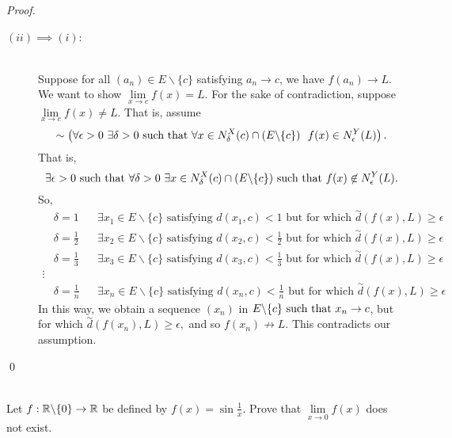 \begin{proof}
\begin{description}
        \item[$(ii) \implies (i)$:] \leavevmode \\
        Suppose for all $(a_n) \in E \backslash \{c\}$ satisfying $a_n \to c$, we have $f(a_n) \to L.$ We want to show $\lim \limits_{x \to c} f(x) = L.$ For the sake of contradiction, suppose $\lim \limits_{x \to c} f(x) \not = L$. That is, assume
        $$\sim \left(\forall \epsilon > 0 ~\exists \delta > 0 \text{ such that } \forall x \in N_{\delta}^{X}(c)\cap (E \backslash \{c\}) ~~f(x) \in N_{\epsilon}^{Y}(L)\right).$$
        That is,
        $$\exists \epsilon > 0 \text{ such that } \forall \delta > 0 ~\exists x \in N_{\delta}^{X}(c) \cap (E \backslash \{c\}) \text{ such that } f(x) \not \in N_{\epsilon}^{Y}(L).$$
        So,
        \begin{align*}
            &\delta = 1 &&\exists x_1 \in E\backslash\{c\} \text{ satisfying $d(x_1, c) < 1$ but for which $\overset{\sim}{d}(f(x), L) \geq \epsilon$} \\
            &\delta = \frac{1}{2} &&\exists x_2 \in E\backslash\{c\} \text{ satisfying $d(x_2, c) < \frac{1}{2}$ but for which $\overset{\sim}{d}(f(x), L) \geq \epsilon$} \\
            &\delta = \frac{1}{3} &&\exists x_3 \in E\backslash\{c\} \text{ satisfying $d(x_3, c) < \frac{1}{3}$ but for which $\overset{\sim}{d}(f(x), L) \geq \epsilon$} \\
            \vdots \\
            &\delta = \frac{1}{n} &&\exists x_n \in E\backslash\{c\} \text{ satisfying $d(x_n, c) < \frac{1}{n}$ but for which $\overset{\sim}{d}(f(x), L) \geq \epsilon$}
        \end{align*}
        In this way, we obtain a sequence $(x_n)$ in $E\backslash \{c\} \text{ such that } x_n \to c$, but for which $\overset{\sim}{d}(f(x_n), L) \geq \epsilon,$ and so $f(x_n) \not \to L.$ This contradicts our assumption.
    \end{description}
    \qed
\end{proof}

\begin{example} \leavevmode \\
    Let $f: \mathbb{R} \backslash \{0\} \to \mathbb{R}$ be defined by $f(x) = \sin\frac{1}{x}.$ Prove that $\lim \limits_{x \to 0} f(x)$ does not exist.
\end{example}

